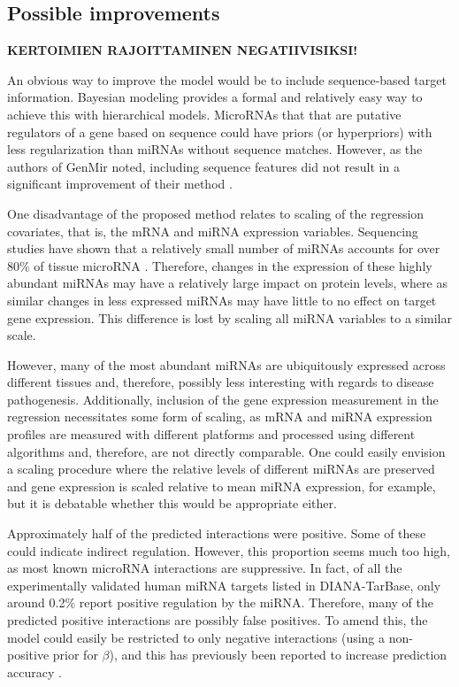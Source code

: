 \subsection*{Possible improvements}

\textbf{KERTOIMIEN RAJOITTAMINEN NEGATIIVISIKSI!}

An obvious way to improve the model would be to include sequence-based target
information. Bayesian modeling provides a formal and relatively easy way to
achieve this with hierarchical models. MicroRNAs that that are putative
regulators of a gene based on sequence could have priors (or hyperpriors) with
less regularization than miRNAs without sequence matches. However, as
the authors of GenMir noted, including sequence features did not result
in a significant improvement of their method \citep{Huang2007}.

One disadvantage of the proposed method relates to scaling of the regression
covariates, that is, the mRNA and miRNA expression variables. Sequencing studies have shown
that a relatively small number of miRNAs accounts for over 80\% of tissue microRNA
\citep{Landgraf2007}. Therefore, changes in the expression of these highly
abundant miRNAs may have a relatively large impact on protein levels, where as
similar changes in less expressed miRNAs may have little to no effect on target gene
expression. This difference is lost by scaling all miRNA variables to a similar scale.

However, many of the most abundant miRNAs are ubiquitously expressed across
different tissues \citep{Landgraf2007} and, therefore, possibly less
interesting with regards to disease pathogenesis. Additionally, inclusion of
the gene expression measurement in the regression necessitates some form of
scaling, as mRNA and miRNA expression profiles are measured with different platforms
and processed using different algorithms and, therefore, are not directly
comparable. One could easily envision a scaling procedure where the relative
levels of different miRNAs are preserved and gene expression is scaled
relative to mean miRNA expression, for example, but it is debatable whether
this would be appropriate either.

Approximately half of the predicted interactions were positive. Some of these
could indicate indirect regulation. However, this proportion seems much too
high, as most known microRNA interactions are suppressive. In fact, of all the
experimentally validated human miRNA targets listed in DIANA-TarBase, only
around 0.2\% report positive regulation by the miRNA. Therefore, many of the
predicted positive interactions are possibly false positives. To amend this,
the model could easily be restricted to only negative interactions (using a
non-positive prior for $\beta$), and this has previously been reported to
increase prediction accuracy \citep{Muniategui2013}.

